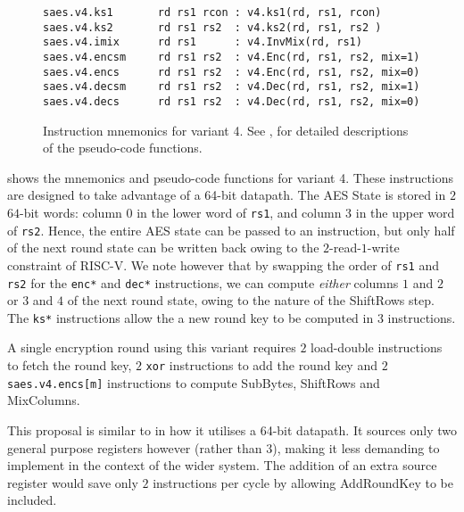
\begin{figure}
\begin{lstlisting}[language=pseudo,style=block]
saes.v4.ks1       rd rs1 rcon : v4.ks1(rd, rs1, rcon)
saes.v4.ks2       rd rs1 rs2  : v4.ks2(rd, rs1, rs2 )
saes.v4.imix      rd rs1      : v4.InvMix(rd, rs1)
saes.v4.encsm     rd rs1 rs2  : v4.Enc(rd, rs1, rs2, mix=1)
saes.v4.encs      rd rs1 rs2  : v4.Enc(rd, rs1, rs2, mix=0)
saes.v4.decsm     rd rs1 rs2  : v4.Dec(rd, rs1, rs2, mix=1)
saes.v4.decs      rd rs1 rs2  : v4.Dec(rd, rs1, rs2, mix=0)
\end{lstlisting}
\caption{
    Instruction mnemonics for variant 4.
    See ,  for detailed
    descriptions of the pseudo-code functions.
}
\label{fig:mnemonics:v4}
\end{figure}

 shows the mnemonics and pseudo-code functions
for variant 4.
These instructions are designed to take advantage of a 64-bit
datapath.
The AES State is stored in $2$ $64$-bit words: column $0$ in the
lower word of {\tt rs1}, and column $3$ in the upper word of {\tt rs2}.
Hence, the entire AES state can be passed to an instruction, but only
half of the next round state can be written back owing to the
$2$-read-$1$-write constraint of RISC-V.
We note however that by swapping the order of {\tt rs1} and {\tt rs2}
for the {\tt enc*} and {\tt dec*} instructions, we can compute {\em either}
columns $1$ and $2$ or $3$ and $4$ of the next round state, owing to
the nature of the ShiftRows step.
The {\tt ks*} instructions allow the a new round key to be computed
in $3$ instructions.

A single encryption round using this variant requires
$2$ load-double instructions to fetch the round key,
$2$ {\tt xor} instructions to add the round key
and
$2$ {\tt saes.v4.encs[m]} instructions to compute SubBytes, ShiftRows
and MixColumns.

This proposal is similar to \cite{SPARC:16} in how it utilises
a 64-bit datapath.
It sources only two general purpose registers however (rather than $3$),
making it less demanding to implement in the context of the wider
system.
The addition of an extra source register would save only $2$ instructions
per cycle by allowing AddRoundKey to be included.

